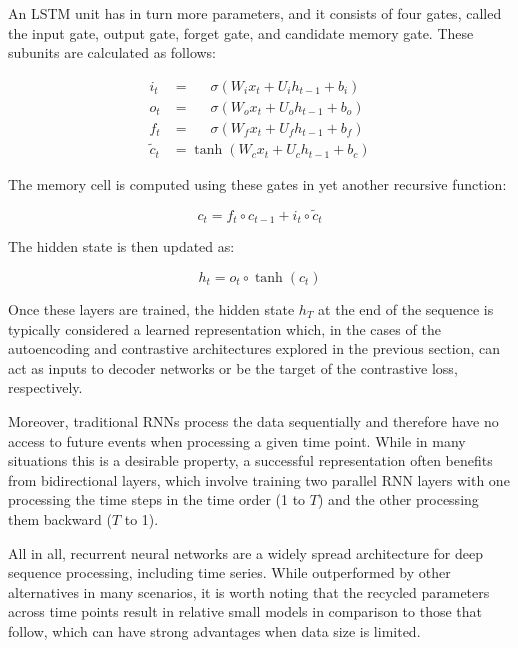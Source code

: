 An LSTM unit has in turn more parameters, and it consists of four gates, called the input gate, output gate, forget gate, and candidate memory gate. These subunits are calculated as follows:

\begin{align}
i_t &= \phantom{{}_tan} \sigma(W_i x_t + U_i h_{t-1} + b_i) \\
o_t &= \phantom{{}_tan} \sigma(W_o x_t + U_o h_{t-1} + b_o) \\
f_t &= \phantom{{}_tan} \sigma(W_f x_t + U_f h_{t-1} + b_f) \\
\tilde{c}_t &= \tanh(W_c x_t + U_c h_{t-1} + b_c)
\label{eq:2.14-2.17}
\end{align}

\noindent The memory cell is computed using these gates in yet another recursive function:

 \begin{equation}
c_t = f_t \circ c_{t-1} + i_t \circ \tilde{c}_t
\label{eq:2.18}
\end{equation}

The hidden state is then updated as:

\begin{equation}
h_t = o_t \circ \tanh(c_t)
\label{eq:2.19}
\end{equation}

Once these layers are trained, the hidden state $h_T$ at the end of the sequence is typically considered a learned representation which, in the cases of the autoencoding and contrastive architectures explored in the previous section, can act as inputs to decoder networks or be the target of the contrastive loss, respectively.

Moreover, traditional RNNs process the data sequentially and therefore have no access to future events when processing a given time point. While in many situations this is a desirable property, a successful representation often benefits from bidirectional layers, which involve training two parallel RNN layers with one processing the time steps in the time order (1 to $T$) and the other processing them backward ($T$ to 1). 

All in all, recurrent neural networks are a widely spread architecture for deep sequence processing, including time series. While outperformed by other alternatives in many scenarios, it is worth noting that the recycled parameters across time points result in relative small models in comparison to those that follow, which can have strong advantages when data size is limited.


